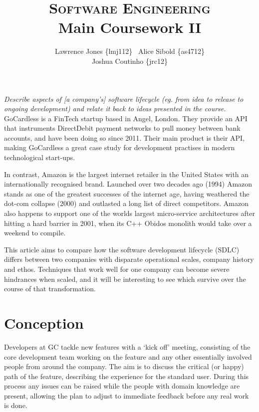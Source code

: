 \documentclass[11pt]{article}
\title{\textsc{Software Engineering}\\Main Coursework II}
\author{Lawrence Jones \{lmj112\} \  Alice Sibold \{as4712\} \\
        Joshua Coutinho \{jrc12\}}
\date{}
\begin{document}
\maketitle


\textit{Describe aspects of [a company's] software lifecycle (eg. from idea to release
to ongoing development) and relate it back to ideas presented in the course.}
\\

GoCardless is a FinTech startup based in Angel, London. They provide an API that
instruments DirectDebit payment networks to pull money between bank accounts,
and have been doing so since 2011. Their main product is their API, making
GoCardless a great case study for development practises in modern technological
start-ups.

In contrast, Amazon is the largest internet retailer in the United States with
an internationally recognised brand. Launched over two decades ago (1994) Amazon
stands as one of the greatest successes of the internet age, having weathered
the dot-com collapse (2000) and outlasted a long list of direct competitors.
Amazon also happens to support one of the worlds largest micro-service
architectures after hitting a hard barrier in 2001, when its C++ Obidos monolith
would take over a weekend to compile.

This article aims to compare how the software development lifecycle (SDLC)
differs between two companies with disparate operational scales, company history
and ethos. Techniques that work well for one company can become severe
hindrances when scaled, and it will be interesting to see which survive over
the course of that transformation.

\section{Conception}

Developers at GC tackle new features with a `kick off' meeting, consisting of
the core development team working on the feature and any other essentially
involved people from around the company. The aim is to discuss the critical (or
happy) path of the feature, describing the experience for the standard user.
During this process any issues can be raised while the people with domain
knowledge are present, allowing the plan to adjust to immediate feedback before
any real work is done.
\end{document}
